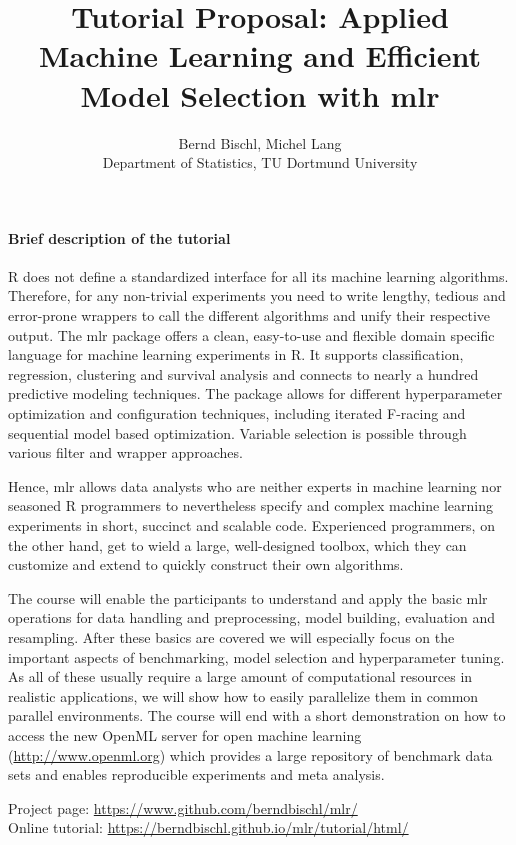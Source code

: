 \documentclass{article}
\title{Tutorial Proposal: Applied Machine Learning and Efficient Model Selection with mlr}
\author{Bernd Bischl, Michel Lang\\
Department of Statistics, TU Dortmund University}
\date{}
\begin{document}
\maketitle

\paragraph{Brief description of the tutorial}
R does not define a standardized interface for all its machine learning algorithms. Therefore, for
any non-trivial experiments you need to write lengthy, tedious and error-prone wrappers to call the
different algorithms and unify their respective output. The mlr package offers a clean, easy-to-use
and flexible domain specific language for machine learning experiments in R. It supports
classification, regression, clustering and survival analysis and connects to nearly a hundred
predictive modeling techniques. The package allows for different hyperparameter optimization and
configuration techniques, including iterated F-racing and sequential model based optimization.
Variable selection is possible through various filter and wrapper approaches. 

Hence, mlr allows data analysts who are neither experts in machine learning nor seasoned
R programmers to nevertheless specify and complex machine learning experiments in short, succinct
and scalable code. Experienced programmers, on the other hand, get to wield a large, well-designed toolbox, 
which they can customize and extend to quickly construct their own algorithms.

The course will enable the participants to understand and apply the basic mlr operations for data
handling and preprocessing, model building, evaluation and resampling. After these basics are
covered we will especially focus on the important aspects of benchmarking, model selection and
hyperparameter tuning. As all of these usually require a large amount of computational resources in
realistic applications, we will show how to easily parallelize them in common parallel environments.
The course will end with a short demonstration on how to access the new OpenML server for open
machine learning (\url{http://www.openml.org}) which provides a large repository of benchmark data sets 
and enables reproducible experiments and meta analysis.

Project page: \url{https://www.github.com/berndbischl/mlr/}\\
Online tutorial: \url{https://berndbischl.github.io/mlr/tutorial/html/}
\end{document}
